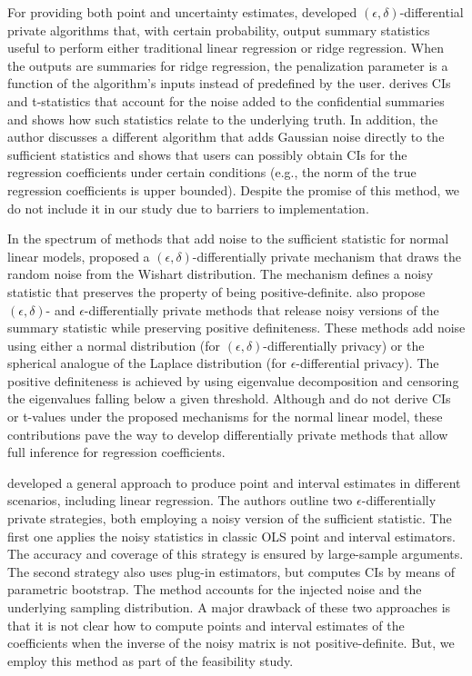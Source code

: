 For providing both point and uncertainty estimates, \cite{sheffet2017differentially} developed $(\epsilon,\delta)$-differential private algorithms that, with certain probability, output summary statistics useful to perform either traditional linear regression or ridge regression. When the outputs are summaries for ridge regression, the penalization parameter is a function of the algorithm's inputs instead of predefined by the user. \cite{sheffet2017differentially} derives CIs and t-statistics that account for the noise added to the confidential summaries and shows how such statistics relate to the underlying truth. In addition, the author discusses a different algorithm that adds Gaussian noise directly to the sufficient statistics and shows that users can possibly obtain CIs for the regression coefficients under certain conditions (e.g., the norm of the true regression coefficients is upper bounded). Despite the promise of this method, we do not include it in our study due to barriers to implementation.

In the spectrum of methods that add noise to the sufficient statistic for normal linear models, \cite{sheffet2019old} proposed a $(\epsilon,\delta)$-differentially private mechanism that draws the random noise from the Wishart distribution. The mechanism defines a noisy statistic that preserves the property of being positive-definite. \cite{wang2019differentially} also propose $(\epsilon,\delta)$- and $\epsilon$-differentially private methods that release noisy versions of the summary statistic while preserving positive definiteness. These methods add noise using either a normal distribution (for $(\epsilon,\delta)$-differentially privacy) or the spherical analogue of the Laplace distribution (for $\epsilon$-differential privacy). The positive definiteness is achieved by using eigenvalue decomposition and censoring the eigenvalues falling below a given threshold. Although \cite{sheffet2019old} and \cite{wang2019differentially} do not derive CIs or t-values under the proposed mechanisms for the normal linear model, these contributions pave the way to develop differentially private methods that allow full inference for regression coefficients.  

\cite{ferrando2020general} developed a general approach to produce point and interval estimates in different scenarios, including linear regression. The authors outline two $\epsilon$-differentially private strategies, both employing a noisy version of the sufficient statistic. The first one applies the noisy statistics in classic OLS point and interval estimators. The accuracy and coverage of this strategy is ensured by large-sample arguments. The second strategy also uses plug-in estimators, but computes CIs by means of parametric bootstrap. The method accounts for the injected noise and the underlying sampling distribution. A major drawback of these two approaches is that it is not clear how to compute points and interval estimates of the coefficients when the inverse of the noisy matrix is not positive-definite. But, we employ this method as part of the feasibility study.

